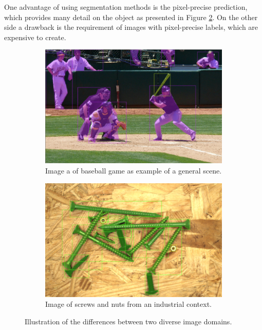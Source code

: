 One advantage of using segmentation methods is the pixel-precise prediction, which provides many detail on the object as presented in Figure \ref{fig:ch1:image_industrial}.
On the other side a drawback is the requirement of images with pixel-precise labels, which are expensive to create.
\begin{figure} [b]
	\centering
	\begin{subfigure}[b]{0.4\textwidth}
		\centering
		\includegraphics[width=\textwidth]{figures/chap1_general_objects.png}
		\caption{
			Image a of baseball game as example of a general scene.}
		\label{fig:ch1:image_standards}
	\end{subfigure}
	\hfill
	\begin{subfigure}[b]{0.4\textwidth}
		\centering
		\includegraphics[width=\textwidth]{figures/chap1_industrial_objects.png}
		\caption{
			Image of screws and nuts from an industrial context.}
		\label{fig:ch1:image_industrial}
	\end{subfigure}
	\caption[Semantic Segmentation Visualization]{
		Illustration of the differences between two diverse image domains.
	} \label{fig:ch1:image}
\end{figure}


